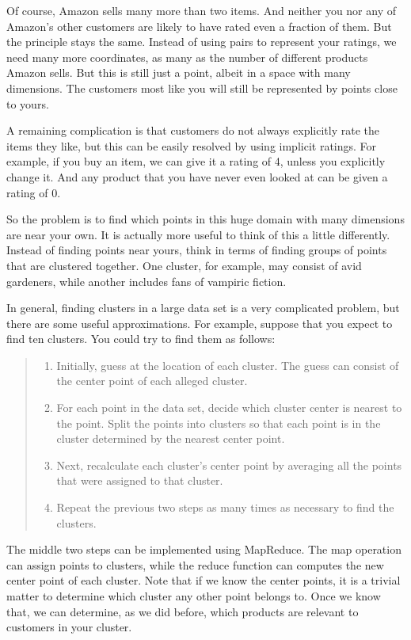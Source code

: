 Of course, Amazon sells many more than two items.  And neither you nor any
of Amazon's other customers are likely to have rated even a fraction of them.
But the principle stays the same.  Instead of using pairs to represent your
ratings, we need many more coordinates, as many as the number of 
different products Amazon sells.
But this is still just a point, albeit in a space with many dimensions.  
The customers most like you will still be represented by points close to yours.

A remaining complication is that customers do not always explicitly rate the
items they like, but this can be easily resolved by using implicit ratings.
For example, if you buy an item, we can give it a rating of 4, unless you
explicitly change it.  And any product that you have never even looked at
can be given a rating of 0.

So the problem is to find which points in this huge domain with many dimensions 
are near your own.  It is actually more useful to think of this a little differently.
Instead of finding points near yours, think in terms of finding groups of
points that are clustered together.  One cluster, for example, may consist of
avid gardeners, while another includes fans of vampiric fiction.

In general, finding clusters in a large data set is a very complicated problem,
but there are some useful approximations.  For example, suppose that you expect
to find ten clusters.  You could try to find them as follows:
\begin{quote}
\begin{enumerate}
    \item Initially, guess at the location of each cluster.  The guess can consist
        of the center point of each alleged cluster.
    \item For each point in the data set, decide which cluster center is nearest
        to the point.  Split the points into clusters so that each point is
        in the cluster determined by the nearest center point.
    \item Next, recalculate each cluster's center point by averaging all the
        points that were assigned to that cluster.
    \item Repeat the previous two steps as many times as necessary to find the
        clusters.
\end{enumerate}
\end{quote}
The middle two steps can be implemented using MapReduce.  The map operation can
assign points to clusters, while the reduce function can computes the new center
point of each cluster.  Note that if we know the center points, it is a trivial
matter to determine which cluster any other point belongs to.  Once we know that, 
we can determine, as we did before, which products are relevant to customers 
in your cluster.

